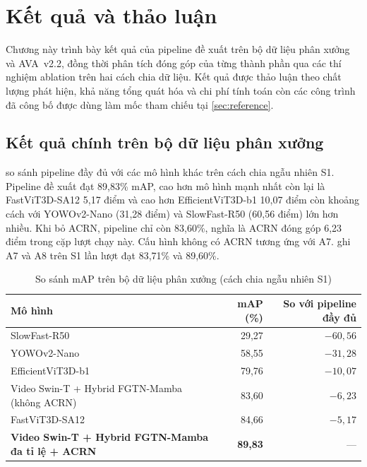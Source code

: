 \chapter{Kết quả và thảo luận}
\label{ch:results}

Chương này trình bày kết quả của pipeline đề xuất trên bộ dữ liệu phân xưởng và AVA~v2.2, đồng thời phân tích đóng góp của từng thành phần qua các thí nghiệm ablation trên hai cách chia dữ liệu. Kết quả được thảo luận theo chất lượng phát hiện, khả năng tổng quát hóa và chi phí tính toán còn các công trình đã công bố được dùng làm mốc tham chiếu tại \cref{sec:reference}.

\section{Kết quả chính trên bộ dữ liệu phân xưởng}
\label{sec:main-results}

 so sánh pipeline đầy đủ với các mô hình khác trên cách chia ngẫu nhiên S1. Pipeline đề xuất đạt 89,83\% mAP, cao hơn mô hình mạnh nhất còn lại là FastViT3D-SA12 5,17 điểm và cao hơn EfficientViT3D-b1 10,07 điểm còn khoảng cách với YOWOv2-Nano (31,28 điểm) và SlowFast-R50 (60,56 điểm) lớn hơn nhiều. Khi bỏ ACRN, pipeline chỉ còn 83,60\%, nghĩa là ACRN đóng góp 6,23 điểm trong cặp lượt chạy này. Cấu hình không có ACRN tương ứng với A7.  ghi A7 và A8 trên S1 lần lượt đạt 83,71\% và 89,60\%.

\begin{table}[htbp]
\centering
\caption{So sánh mAP trên bộ dữ liệu phân xưởng (cách chia ngẫu nhiên S1)}
\label{tab:main-results}
\begin{tabularx}{\textwidth}{Xrr}
\toprule
\textbf{Mô hình} & \textbf{mAP (\%)} & \textbf{So với pipeline đầy đủ}\\
\midrule
SlowFast-R50 \cite{feichtenhofer2019slowfast} & 29,27 & $-60{,}56$\\
YOWOv2-Nano \cite{yang2023yowov2} & 58,55 & $-31{,}28$\\
EfficientViT3D-b1 \cite{cai2023efficientvit} & 79,76 & $-10{,}07$\\
Video Swin-T + Hybrid FGTN-Mamba (không ACRN) & 83,60 & $-6{,}23$\\
FastViT3D-SA12 \cite{vasu2023fastvit} & 84,66 & $-5{,}17$\\
\textbf{Video Swin-T + Hybrid FGTN-Mamba đa tỉ lệ + ACRN} & \textbf{89,83} & ---\\
\bottomrule
\end{tabularx}
\end{table}

